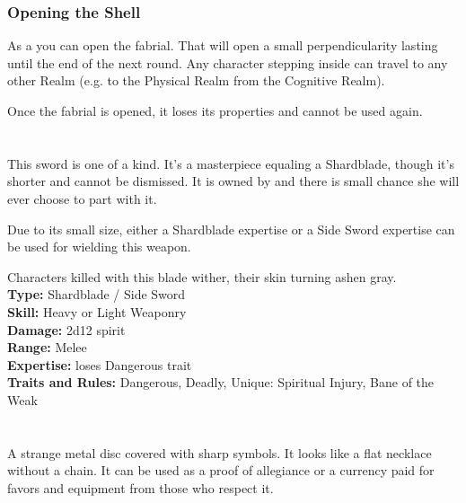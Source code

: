 \subsubsection{Opening the Shell}

As a \iconAction{} you can open the fabrial. That will open a small perpendicularity lasting until the end of the next round. Any character stepping inside can travel to any other Realm (e.g. to the Physical Realm from the Cognitive Realm).

Once the fabrial is opened, it loses its properties and cannot be used again.




\section{\lootHighmarshalsBlade}

This sword is one of a kind. It's a masterpiece equaling a Shardblade, though it's shorter and cannot be dismissed. It is owned by \npcHighmarshal{} and there is small chance she will ever choose to part with it.

Due to its small size, either a Shardblade expertise or a Side Sword expertise can be used for wielding this weapon. 

Characters killed with this blade wither, their skin turning ashen gray.\\

\noindent
\textbf{Type:} Shardblade / Side Sword \\
\textbf{Skill:} Heavy or Light Weaponry\\
\textbf{Damage:} 2d12 spirit \\
\textbf{Range:} Melee\\
\textbf{Expertise:} loses Dangerous trait\\
\textbf{Traits and Rules:} Dangerous, Deadly, Unique: Spiritual Injury, Bane of the Weak




\newpage
\section{\lootScadrialCoin}

A strange metal disc covered with sharp symbols. It looks like a flat necklace without a chain. It can be used as a proof of allegiance or a currency paid for favors and equipment from those who respect it.




